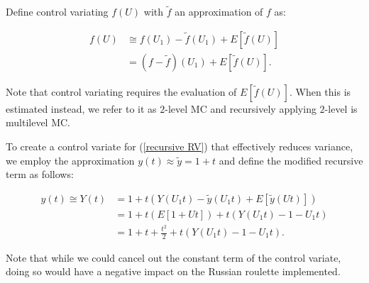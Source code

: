 \documentclass[a4paper,12pt]{article}
\begin{document}


\begin{definition} \label{CV}
    Define control variating $f(U)$ with $\tilde{f}$ an approximation of $f$ as:

    \begin{align}
        f(U) & \cong f(U_{1})-\tilde{f}(U_{1}) + E[\tilde{f}(U)] \\
             & = (f-\tilde{f})(U_{1}) + E[\tilde{f}(U)]
        .
    \end{align}

    Note that control variating requires the evaluation of
    $E[\tilde{f}(U)]$.  When this is estimated instead, we refer to it as $2$-level MC
    and recursively applying $2$-level is multilevel MC.
\end{definition}


\begin{example} \label{ex:CV}
    To create a control variate for (\ref{recursive RV}) that
    effectively reduces variance, we employ the approximation
    $y(t) \approx \tilde{y} =1+t$ and define the modified recursive term as follows:

    \begin{align}
        y(t) \cong Y(t) & = 1 + t(Y(U_{1}t) - \tilde{y}(U_{1}t) + E[\tilde{y}(Ut)])     \\
                        & = 1 + t \left( E[1 + Ut]  \right) + t(Y(U_{1}t) - 1 - U_{1}t) \\
                        & = 1 + t + \frac{t^2}{2} + t(Y(U_{1}t) - 1 - U_{1}t).
    \end{align}

    Note that while we could cancel out the constant term
    of the control variate, doing so would have a negative impact
    on the Russian roulette implemented.
\end{example}

\end{document}
